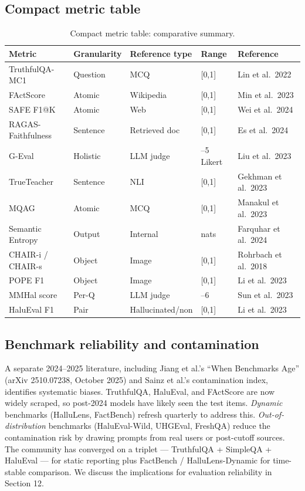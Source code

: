\documentclass{article}
\begin{document}
\subsection{Compact metric table}\label{compact-metric-table}

\begin{table}[t]
\centering
\caption{Compact metric table: comparative summary.}
\label{tab:compact-metric-table}
\begin{tabular}{>{\raggedright\arraybackslash}p{0.2400\linewidth}
  >{\raggedright\arraybackslash}p{0.1467\linewidth}
  >{\raggedright\arraybackslash}p{0.2133\linewidth}
  >{\raggedright\arraybackslash}p{0.1333\linewidth}
  >{\raggedright\arraybackslash}p{0.2667\linewidth}}
\toprule
Metric & Granularity & Reference type & Range & Reference \\
\midrule
TruthfulQA-MC1 & Question & MCQ & {[}0,1{]} & Lin et al.~2022 \\
FActScore & Atomic & Wikipedia & {[}0,1{]} & Min et al.~2023 \\
SAFE F1@K & Atomic & Web & {[}0,1{]} & Wei et al.~2024 \\
RAGAS-Faithfulness & Sentence & Retrieved doc & {[}0,1{]} & Es et al.~2024 \\
G-Eval & Holistic & LLM judge & 1--5 Likert & Liu et al.~2023 \\
TrueTeacher & Sentence & NLI & {[}0,1{]} & Gekhman et al.~2023 \\
MQAG & Atomic & MCQ & {[}0,1{]} & Manakul et al.~2023 \\
Semantic Entropy & Output & Internal & nats & Farquhar et al.~2024 \\
CHAIR-i / CHAIR-s & Object & Image & {[}0,1{]} & Rohrbach et al.~2018 \\
POPE F1 & Object & Image & {[}0,1{]} & Li et al.~2023 \\
MMHal score & Per-Q & LLM judge & 0--6 & Sun et al.~2023 \\
HaluEval F1 & Pair & Hallucinated/non & {[}0,1{]} & Li et al.~2023 \\
\end{tabular}
\end{table}

\subsection{Benchmark reliability and contamination}\label{benchmark-reliability-and-contamination}

A separate 2024--2025 literature, including Jiang et al.'s ``When Benchmarks Age'' (arXiv 2510.07238, October 2025) and Sainz et al.'s contamination index, identifies systematic biases. TruthfulQA, HaluEval, and FActScore are now widely scraped, so post-2024 models have likely seen the test items. \emph{Dynamic} benchmarks (HalluLens, FactBench) refresh quarterly to address this. \emph{Out-of-distribution} benchmarks (HaluEval-Wild, UHGEval, FreshQA) reduce the contamination risk by drawing prompts from real users or post-cutoff sources. The community has converged on a triplet --- TruthfulQA + SimpleQA + HaluEval --- for static reporting plus FactBench / HalluLens-Dynamic for time-stable comparison. We discuss the implications for evaluation reliability in Section 12.
\end{document}
